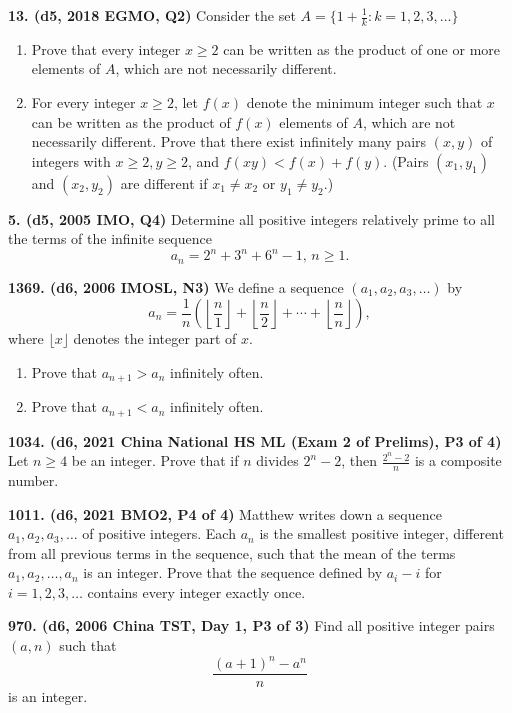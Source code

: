 \documentclass{article}
\begin{document}
\textbf{13. (\color{red}d5\color{black}, 2018 EGMO, Q2)} Consider the set $A = \{1 + \frac 1k : k = 1, 2, 3, \dots \}$
\begin{enumerate}
    \item Prove that every integer $x \geq 2$ can be written as the product of one or more elements of $A$, which are not necessarily different.
    \item For every integer $x \geq 2$, let $f(x)$ denote the minimum integer such that $x$ can be written as the product of $f(x)$ elements of $A$, which are not necessarily different.  Prove that there exist infinitely many pairs $(x, y)$ of integers with $x \geq 2, y \geq 2$, and $f(xy) < f(x) + f(y)$. (Pairs $(x_1, y_1)$ and $(x_2, y_2)$ are different if $x_1 \neq x_2$ or $y_1 \neq y_2$.)
\end{enumerate}

\textbf{5. (\color{red}d5\color{black}, 2005 IMO, Q4)} Determine all positive integers relatively prime to all the terms of the infinite sequence \[a_n=2^n+3^n+6^n -1,\, n\geq 1.\]

\textbf{1369. (\color{red}d6\color{black}, 2006 IMOSL, N3)} We define a sequence $ \left(a_{1},a_{2},a_{3},\ldots \right)$ by
\[ a_{n} = \frac {1}{n}\left(\left\lfloor\frac {n}{1}\right\rfloor + \left\lfloor\frac {n}{2}\right\rfloor + \cdots + \left\lfloor\frac {n}{n}\right\rfloor\right), \] where $\lfloor x\rfloor$ denotes the integer part of $x$.

\begin{enumerate}
    \item Prove that $a_{n+1}>a_n$ infinitely often.
    \item Prove that $a_{n+1}<a_n$ infinitely often.
\end{enumerate}

\textbf{1034. (\color{red}d6\color{black}, 2021 China National HS ML (Exam 2 of Prelims), P3 of 4)} Let \(n \geq 4\) be an integer.  Prove that if \(n\) divides \(2^n-2\), then \(\frac{2^n-2}{n}\) is a composite number.

\textbf{1011. (\color{red}d6\color{black}, 2021 BMO2, P4 of 4)} Matthew writes down a sequence $a_1,a_2,a_3,\ldots$ of positive integers. Each $a_n$ is the smallest
positive integer, different from all previous terms in the sequence, such that the mean of the
terms $a_1,a_2,\ldots,a_n$ is an integer. Prove that the sequence defined by $a_i-i$ for $i=1,2,3,\ldots$ contains every integer exactly once.

\textbf{970. (\color{red}d6\color{black}, 2006 China TST, Day 1, P3 of 3)} Find all positive integer pairs $(a,n)$ such that \[ \frac{(a+1)^{n}-a^{n}}{n}\] is an integer.
\end{document}
